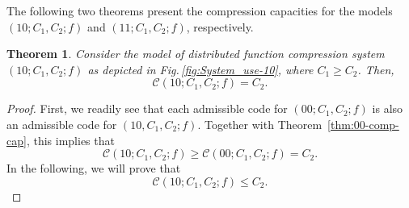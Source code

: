 \documentclass[11pt,draftclsnofoot,onecolumn]{IEEEtran}
\newtheorem{theorem}{Theorem}
\begin{document}
The following two theorems present the compression capacities for the models $(10;C_{1}, C_{2};  f)$ and $(11;C_{1}, C_{2};  f)$, respectively.


\begin{theorem}\label{thm:10-comp-cap}
Consider the model of distributed function compression system $(10;C_{1}, C_{2};  f)$ as depicted in Fig.\,\ref{fig:System_use-10}, where $C_1\geq C_2$. Then,
\begin{equation*}
\mathcal{C}(10;C_1,C_2;f)=C_2.
\end{equation*}
\end{theorem}

\begin{proof}
First, we readily see that  each admissible code for $(00;C_1,C_2;f)$ is also an admissible code for
$(10,C_1,C_2;f)$. Together with Theorem~\ref{thm:00-comp-cap},  this implies that
\begin{equation}
\mathcal{C}(10;C_1,C_2;f)\geq \mathcal{C}(00;C_1,C_2;f)=C_2.\label{pfthm:10-comp-cap-dir-1}
\end{equation}
In the following, we will prove that
\begin{equation*}
\mathcal{C}(10;C_1,C_2;f)\leq C_2.\label{pfthm:10-comp-cap-conv-1}
\end{equation*}


\end{proof}
\end{document}
